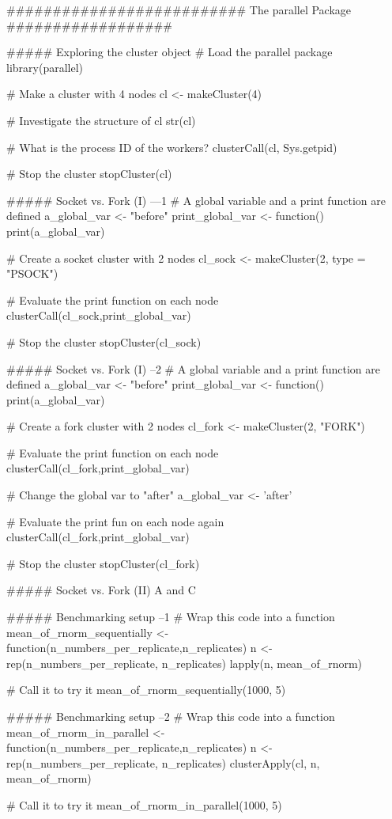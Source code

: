 ##########################  The parallel Package   ##################

##### Exploring the cluster object
# Load the parallel package
library(parallel)

# Make a cluster with 4 nodes
cl <- makeCluster(4)

# Investigate the structure of cl
str(cl)

# What is the process ID of the workers?
clusterCall(cl, Sys.getpid)

# Stop the cluster
stopCluster(cl)


##### Socket vs. Fork (I) ---1
# A global variable and a print function are defined
a_global_var <- "before"
print_global_var <- function() print(a_global_var)

# Create a socket cluster with 2 nodes
cl_sock <- makeCluster(2, type = "PSOCK")

# Evaluate the print function on each node
  clusterCall(cl_sock,print_global_var)

# Stop the cluster
stopCluster(cl_sock)


##### Socket vs. Fork (I) --2
# A global variable and a print function are defined
a_global_var <- "before"
print_global_var <- function() print(a_global_var)

# Create a fork cluster with 2 nodes
cl_fork <- makeCluster(2, "FORK")

# Evaluate the print function on each node
clusterCall(cl_fork,print_global_var)

# Change the global var to "after"
a_global_var <- 'after'

# Evaluate the print fun on each node again
clusterCall(cl_fork,print_global_var)

# Stop the cluster
stopCluster(cl_fork)


##### Socket vs. Fork (II)
A and C


##### Benchmarking setup --1
# Wrap this code into a function
mean_of_rnorm_sequentially <- function(n_numbers_per_replicate,n_replicates)
{
n <- rep(n_numbers_per_replicate, n_replicates)
lapply(n, mean_of_rnorm)
}

# Call it to try it
mean_of_rnorm_sequentially(1000, 5)


##### Benchmarking setup --2
# Wrap this code into a function
mean_of_rnorm_in_parallel <- function(n_numbers_per_replicate,n_replicates){
n <- rep(n_numbers_per_replicate, n_replicates)
clusterApply(cl, n, mean_of_rnorm) 
}

# Call it to try it
mean_of_rnorm_in_parallel(1000, 5)


